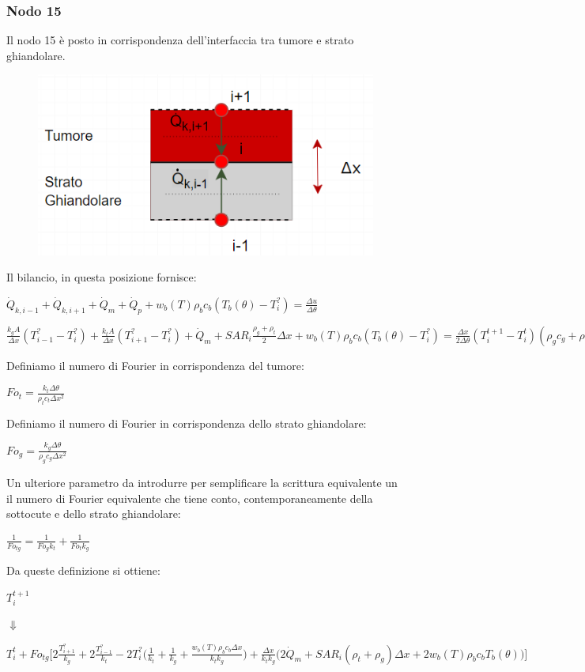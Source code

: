 \subsubsection*{Nodo 15}
Il nodo 15 è posto in corrispondenza dell'interfaccia tra tumore e strato ghiandolare.
\begin{figure}[H]
    \centering
    \includegraphics[width=.6\textwidth]{Immagini/Nodi/nodo15.png} 
    \label{nodo10}
\end{figure}
\noindent
Il bilancio, in questa posizione fornisce:
\begin{center}
	$ \Dot{Q} _{k, i-1} +\Dot{Q} _{k, i+1}+ \Dot{Q} _{m} +\Dot{Q} _{p}+ w_b (T) \rho _b c_b (T_b(\theta)-T_i ^?)= \frac{\Delta u}{\Delta \theta} $
\end{center}
\vspace{0.15cm}
\begin{center}
	$ \frac{k_{g} A }{\Delta x}(T_{i-1} ^? - T_i ^? ) + \frac{k_t A }{\Delta x}(T_{i+1} ^? - T_i ^? )+ \Dot{Q} _{m} + SAR_i \frac{\rho _{g} + \rho _t}{2} \Delta x + w_b (T) \rho _b c_b (T_b(\theta)-T_i ^?) = \frac{\Delta x}{ 2 \Delta \theta}(T_i ^{t+1} - T_i ^t ) (\rho _{g} c_{g} + \rho _{t} c_{t} )$
\end{center}
Definiamo il numero di Fourier in corrispondenza del tumore:
\begin{center}
	$Fo_{t}= \frac{k_{t} \Delta \theta}{\rho _{t} c_{t} \Delta x^2}$
\end{center}
Definiamo il numero di Fourier in corrispondenza dello strato ghiandolare:
\begin{center}
	$Fo_{g}= \frac{k_{g} \Delta \theta}{\rho _{g} c_{g} \Delta x^2}$
\end{center}
Un ulteriore parametro da introdurre per semplificare la scrittura equivalente un il numero di Fourier equivalente che tiene conto, contemporaneamente della sottocute e dello strato ghiandolare:
\begin{center}
	$\frac{1}{Fo_{tg}}= \frac{1}{Fo_{g}k_t}+ \frac{1}{Fo_{t}k_{g}}$
\end{center}
Da queste definizione si ottiene:
\begin{center}
	$T_i ^{t+1} $
\end{center}
\begin{center}
	$\Downarrow$
\end{center}
\begin{center}
	$T_i ^t + Fo_{tg} \Bigg[ 2\frac{T_{i+1} ^?}{k_g} + 2\frac{T_{i-1} ^?}{k_{t}}- 2T_i ^? \Big(\frac{1}{k_t} + \frac{1}{k_{g}}+ \frac{ w_b (T) \rho _b c_b \Delta x }{k_{t}k_g} \Big) +  \frac{\Delta x }{k_{t}k_g} \Big(2\Dot{Q} _{m} +  SAR_i (\rho _{t}+ \rho _g) \Delta x + 2w_b (T) \rho _b c_b T_b(\theta)\Big) \Bigg]$
\end{center}

